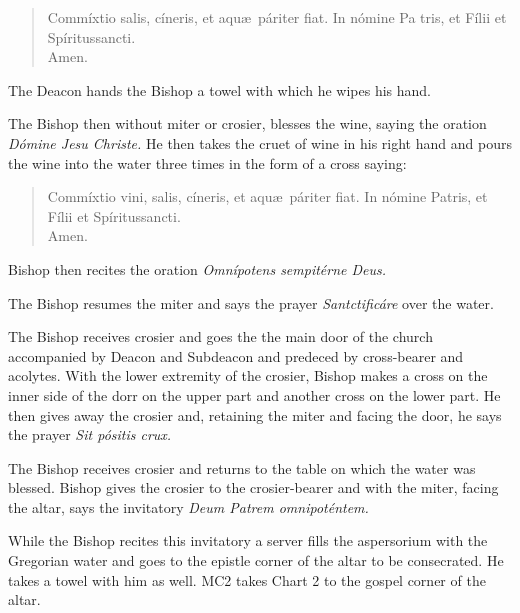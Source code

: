 \documentclass[letterpaper]{report}
\begin{document}
{    \begin{quote}
        Commíxtio salis, cíneris, et aqu\ae\ páriter fiat. In nómine Pa\cross
        tris, et Fí\cross lii et Spíritus\cross sancti. \\
        \rbar Amen.
    \end{quote}

    The Deacon hands the Bishop a towel with which he wipes his hand.

    \rubric The Bishop then without miter or crosier, blesses the wine, saying
    the oration \textit{D\'omine Jesu Christe.} He then takes the cruet of wine
    in his right hand and pours the wine into the water three times in the form
    of a cross saying:

    \begin{quote}
        Commíxtio vini, salis, cíneris, et aqu\ae\ páriter fiat. In nómine
        Pa\cross tris, et Fí\cross lii et Spíritus\cross sancti. \\
        \rbar Amen.
    \end{quote}

    Bishop then recites the oration \textit{Omn\'ipotens sempit\'erne Deus.}

    \rubric The Bishop resumes the miter and says the prayer
    \textit{Santcti\cross ficáre} over the water.

    \rubric The Bishop receives crosier and goes the the main door of the
    church accompanied by Deacon and Subdeacon and predeced by cross-bearer and
    acolytes. With the lower extremity of the crosier, Bishop makes a cross on
    the inner side of the dorr on the upper part and another cross on the lower
    part. He then gives away the crosier and, retaining the miter and facing
    the door, he says the prayer \textit{Sit pósitis crux.}

    \rubric The Bishop receives crosier and returns to the table on which the
    water was blessed. Bishop gives the crosier to the crosier-bearer and with
    the miter, facing the altar, says the invitatory \textit{Deum Patrem
    omnipoténtem.}

    While the Bishop recites this invitatory a server fills the aspersorium
    with the Gregorian water and goes to the epistle corner of the altar to be
    consecrated. He takes a towel with him as well. MC2 takes Chart 2 to the
    gospel corner of the altar.

}
\end{document}
